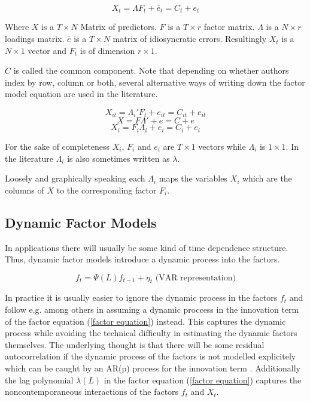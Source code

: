 \documentclass[12pt]{article}
\begin{document}
\begin{equation}
	\label{factor equation, t indexed}
	X_t = \Lambda F_t + \bar e_t = C_t + e_t
\end{equation}

Where $X$ is a $T \times N$ Matrix of predictors. $F$ is a $T \times r$ factor matrix. $\Lambda$ is a $N \times r$ loadings matrix. $\bar e$ is a $T \times N$ matrix of idiosyncratic errors. Resultingly $X_t$ is a $N \times 1$ vector and $F_t$ is of dimension $r \times 1$.


$C$ is called the common component.
Note that depending on whether authors index by row, column or both, several alternative ways of writing down the factor model equation are used in the literature.

\begin{equation}
	\label{factor equation, it indexed}
	X_{it} = \Lambda_i' F_t + e_{it} = C_{it} + e_{it}
\end{equation}
\begin{equation}
	\label{static factor equation}
	X = F \Lambda' + e = C + e
\end{equation}
\begin{equation}
	\label{factor equation, i indexed}
	X_i = F_i \Lambda_i + e_i = C_i + e_i
\end{equation}

For the sake of completeness $X_i$, $F_i$ and $e_i$ are $T \times 1$ vectors while $\Lambda_i$ is $1 \times 1$. In the literature $\Lambda_i$ is also sometimes written as $\lambda$.

Loosely and graphically speaking each $\Lambda_i$ maps the variables $X_i$ which are the columns of $X$ to the corresponding factor $F_i$.



\subsection{Dynamic Factor Models}
In applications there will usually be some kind of time dependence structure. Thus, dynamic factor models introduce a dynamic process into the factors.

\begin{equation}
	\label{time dependence of factors}
	f_t = \Psi(L) f_{t-1} + \eta_t \text{\ \ \ \ \ (VAR representation)}
\end{equation}

In practice it is usually easier to ignore the dynamic process in the factors $f_t$ and follow e.g. \citet{stock2005implications} among others in assuming a dynamic proccess in the innovation term of the factor equation (\ref{factor equation}) instead. This captures the dynamic process while avoiding the technical difficulty in estimating the dynamic factors themselves. The underlying thought is that there will be some residual autocorrelation if the dynamic process of the factors is not modelled explicitely which can be caught by an AR(p) process for the innovation term \citep{breitung2011gls}. Additionally the lag polynomial $\lambda(L)$ in the factor equation (\ref{factor equation}) captures the noncontemporaneous interactions of the factors $f_t$ and $X_t$.
\end{document}
